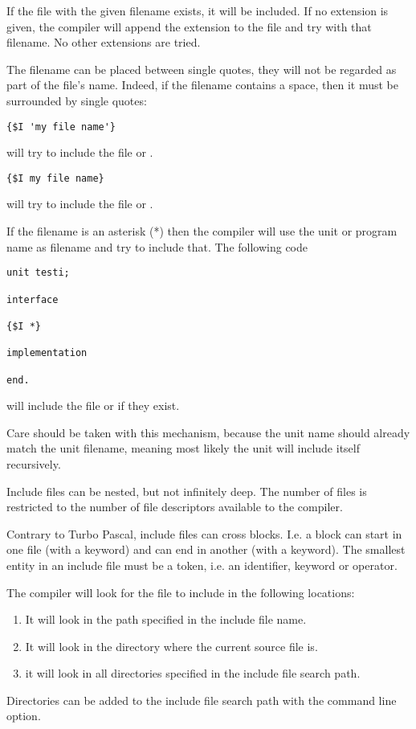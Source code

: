 If the file with the given filename exists, it will be included.
If no extension is given, the compiler will append the  
extension to the file and try with that filename. No other extensions are
tried. 

The filename can be placed between single quotes, they will not be 
regarded as part of the file's name. Indeed, if the filename contains 
a space, then it must be surrounded by single quotes: 

\begin{verbatim}
{$I 'my file name'}
\end{verbatim}
will try to include the file  or .

\begin{verbatim}
{$I my file name}
\end{verbatim}
will try to include the file  or .

If the filename is an asterisk (*) then the compiler will use the unit or
program name as filename and try to include that. The following code

\begin{verbatim}
unit testi;

interface

{$I *}

implementation

end.
\end{verbatim}
will include the file  or  if they exist.

Care should be taken with this mechanism, because the unit name should
already match the unit filename, meaning most likely the unit will include
itself recursively.

Include files can be nested, but not infinitely deep. The number of files is
restricted to the number of file descriptors available to the \fpc compiler.

Contrary to Turbo Pascal, include files can cross blocks. I.e. 
a block can start in one file (with a  keyword) and can end in another (with
a  keyword). The smallest entity in an include file must be a token,
i.e. an identifier, keyword or operator.

The compiler will look for the file to include in the following locations:

\begin{enumerate}
\item It will look in the path specified in the include file name.
\item It will look in the directory where the current source file is.
\item it will look in all directories specified in the include file search
path.
\end{enumerate}
Directories can be added to the include file search path with the 
command line option.

